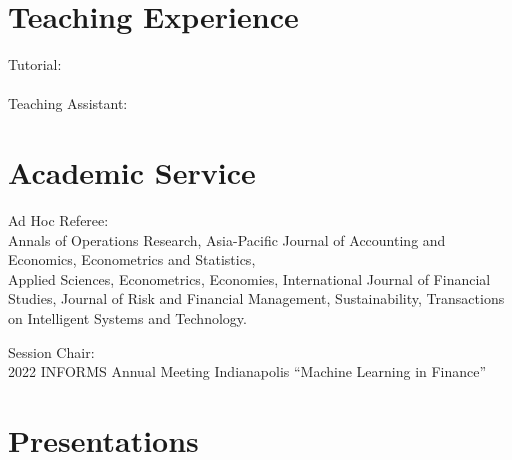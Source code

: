 \documentclass[margin]{res}
\begin{document}
\begin{resume}
\section{\sc Teaching Experience}
Tutorial: \\
\\
Teaching Assistant: \\


\section{\sc Academic Service}

Ad Hoc Referee: \\
Annals of Operations Research,
Asia-Pacific Journal of Accounting and Economics,
Econometrics and Statistics, 
\\
Applied Sciences,
Econometrics,
Economies, 
International Journal of Financial Studies,
Journal of Risk and Financial Management,
Sustainability,
Transactions on Intelligent Systems and Technology.



Session Chair: \\
2022 INFORMS Annual Meeting Indianapolis “Machine Learning in Finance”

\vspace{5mm}

\section{\sc Presentations}


\end{resume}
\end{document}
